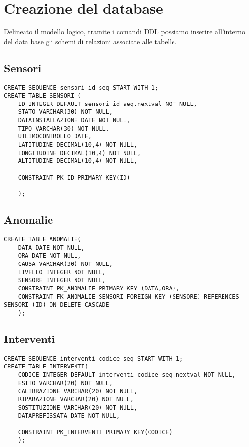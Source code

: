\section{Creazione del database}
Delineato il modello logico, tramite i comandi DDL possiamo inserire all'interno del data base gli schemi di relazioni associate alle tabelle.
\begin{description}

\subsection{Sensori}
\begin{verbatim}
CREATE SEQUENCE sensori_id_seq START WITH 1;
CREATE TABLE SENSORI (
    ID INTEGER DEFAULT sensori_id_seq.nextval NOT NULL,
    STATO VARCHAR(30) NOT NULL,
    DATAINSTALLAZIONE DATE NOT NULL,
    TIPO VARCHAR(30) NOT NULL,
    UTLIMOCONTROLLO DATE,
    LATITUDINE DECIMAL(10,4) NOT NULL,
    LONGITUDINE DECIMAL(10,4) NOT NULL,
    ALTITUDINE DECIMAL(10,4) NOT NULL,
    
    CONSTRAINT PK_ID PRIMARY KEY(ID)
    
    );
\end{verbatim}

\subsection{Anomalie}
\begin{verbatim}
CREATE TABLE ANOMALIE(
    DATA DATE NOT NULL,
    ORA DATE NOT NULL,
    CAUSA VARCHAR(30) NOT NULL,
    LIVELLO INTEGER NOT NULL,
    SENSORE INTEGER NOT NULL,
    CONSTRAINT PK_ANOMALIE PRIMARY KEY (DATA,ORA),
    CONSTRAINT FK_ANOMALIE_SENSORI FOREIGN KEY (SENSORE) REFERENCES SENSORI (ID) ON DELETE CASCADE
    );
\end{verbatim}

\subsection{Interventi}
\begin{verbatim}
CREATE SEQUENCE interventi_codice_seq START WITH 1;
CREATE TABLE INTERVENTI(
    CODICE INTEGER DEFAULT interventi_codice_seq.nextval NOT NULL,
    ESITO VARCHAR(20) NOT NULL,
    CALIBRAZIONE VARCHAR(20) NOT NULL,
    RIPARAZIONE VARCHAR(20) NOT NULL,
    SOSTITUZIONE VARCHAR(20) NOT NULL,
    DATAPREFISSATA DATE NOT NULL,
    
    CONSTRAINT PK_INTERVENTI PRIMARY KEY(CODICE)
    );
\end{verbatim}


\end{description}
